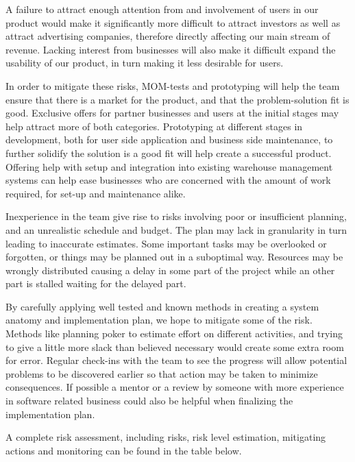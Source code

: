 \documentclass[titlepage]{article}
\begin{document}
A failure to attract enough attention from and involvement of users in our product would make it significantly more difficult to attract investors as well as attract advertising companies, therefore directly affecting our main stream of revenue. Lacking interest from businesses will also make it difficult expand the usability of our product, in turn making it less desirable for users.

In order to mitigate these risks, MOM-tests and prototyping will help the team ensure that there is a market for the product, and that the problem-solution fit is good. Exclusive offers for partner businesses and users at the initial stages may help attract more of both categories. Prototyping at different stages in development, both for user side application and business side maintenance, to further solidify the solution is a good fit will help create a successful product. Offering help with setup and integration into existing warehouse management systems can help ease businesses who are concerned with the amount of work required, for set-up and maintenance alike. 

Inexperience in the team give rise to risks involving poor or insufficient planning, and an unrealistic schedule and budget. The plan may lack in granularity in turn leading to inaccurate estimates. Some important tasks may be overlooked or forgotten, or things may be planned out in a suboptimal way. Resources may be wrongly distributed causing a delay in some part of the project while an other part is stalled waiting for the delayed part.

By carefully applying well tested and known methods in creating a system anatomy and implementation plan, we hope to mitigate some of the risk. Methods like planning poker to estimate effort on different activities, and trying to give a little more slack than believed necessary would create some extra room for error. Regular check-ins with the team to see the progress will allow potential problems to be discovered earlier so that action may be taken to minimize consequences. If possible a mentor or a review by someone with more experience in software related business could also be helpful when finalizing the implementation plan.

A complete risk assessment, including risks, risk level estimation, mitigating actions and monitoring can be found in the table below.
\end{document}
